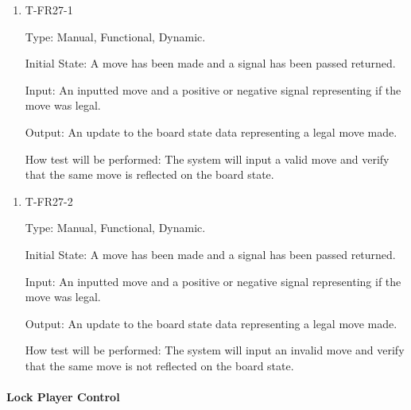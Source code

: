 \documentclass[12pt, titlepage]{article}
\begin{document}
        \begin{enumerate}

        \item{T-FR27-1\\}

            Type: Manual, Functional, Dynamic.
            					
            Initial State: A move has been made and a signal has been passed returned.
            					
            Input: An inputted move and a positive or negative signal representing if the move was legal.
            					
            Output: An update to the board state data representing a legal move made.

            How test will be performed: The system will input a valid move and verify that the same move is reflected on the board state.

        \end{enumerate}
        
        \begin{enumerate}

        \item{T-FR27-2\\}

            Type: Manual, Functional, Dynamic.
            					
            Initial State: A move has been made and a signal has been passed returned.
            					
            Input: An inputted move and a positive or negative signal representing if the move was legal.
            					
            Output: An update to the board state data representing a legal move made.

            How test will be performed: The system will input an invalid move and verify that the same move is not reflected on the board state.

        \end{enumerate}
    
    \paragraph{Lock Player Control}
\end{document}
